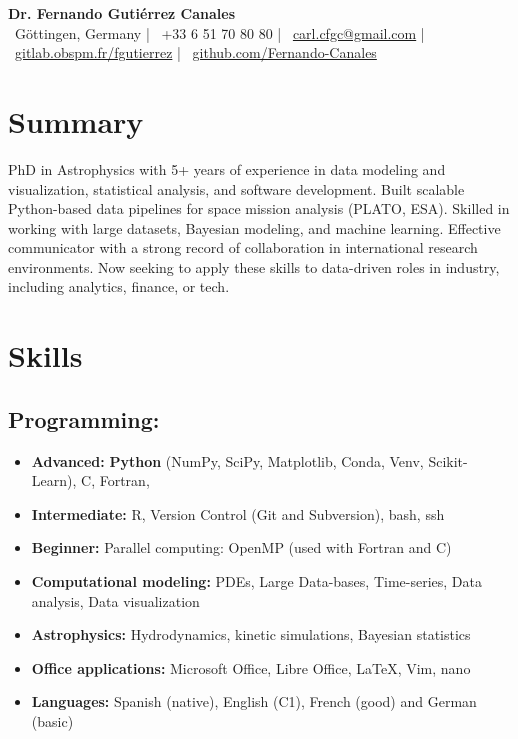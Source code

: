 \documentclass[11pt,a4paper]{article}
\begin{document}
\begin{center}
  {\Huge\bfseries Dr. Fernando Guti\'errez Canales}\\[8pt]
  \faMapMarker*~Göttingen, Germany \quad | \quad
  \faPhone~+33 6 51 70 80 80 \quad | \quad
  \faEnvelope~\href{mailto:carl.cfgc@gmail.com}{carl.cfgc@gmail.com} \quad | \quad
  \faGitlab~\href{https://gitlab.obspm.fr/fgutierrez}{gitlab.obspm.fr/fgutierrez} \quad | \quad
  \faGithub~\href{https://github.com/Fernando-Canales}{github.com/Fernando-Canales}
\end{center}
	
	\vspace{10pt}
	
	\begin{multicols}{2}
		
		\section{Summary}
		PhD in Astrophysics with 5+ years of experience in data modeling and visualization, statistical analysis, and software development. Built scalable Python-based data pipelines for space mission analysis (PLATO, ESA). Skilled in working with large datasets, Bayesian modeling, and machine learning. Effective communicator with a strong record of collaboration in international research environments. Now seeking to apply these skills to data-driven roles in industry, including analytics, finance, or tech.
		\section{Skills}
		
		\subsection{Programming:}
		\begin{itemize}
			\item \textbf{Advanced:} \textbf{Python} (NumPy, SciPy, Matplotlib, Conda, Venv, Scikit-Learn), C, Fortran,
			\item \textbf{Intermediate:} R, Version Control (Git and Subversion), bash, ssh
			\item \textbf{Beginner:} Parallel computing: OpenMP (used with Fortran and C)
			\item \textbf{Computational modeling:} PDEs, Large Data-bases, Time-series, Data analysis, Data visualization
			\item \textbf{Astrophysics:} Hydrodynamics, kinetic simulations, Bayesian statistics
			\item \textbf{Office applications:} Microsoft Office, Libre Office, \LaTeX , Vim, nano
			\item \textbf{Languages:} Spanish (native), English (C1), French (good) and German (basic)
		\end{itemize}
		

\end{multicols}
\end{document}
